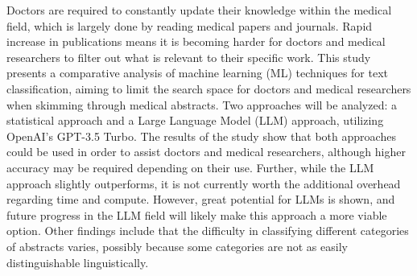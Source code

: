 
Doctors are required to constantly update their knowledge within the medical field, which is largely done by reading medical papers and journals. Rapid increase in publications means it is becoming harder for doctors and medical researchers to filter out what is relevant to their specific work. This study presents a comparative analysis of machine learning (ML) techniques for text classification, aiming to limit the search space for doctors and medical researchers when skimming through medical abstracts. Two approaches will be analyzed: a statistical approach and a Large Language Model (LLM) approach, utilizing OpenAI's GPT-3.5 Turbo. The results of the study show that both approaches could be used in order to assist doctors and medical researchers, although higher accuracy may be required depending on their use. Further, while the LLM approach slightly outperforms, it is not currently worth the additional overhead regarding time and compute. However, great potential for LLMs is shown, and future progress in the LLM field will likely make this approach a more viable option. Other findings include that the difficulty in classifying different categories of abstracts varies, possibly because some categories are not as easily distinguishable linguistically.